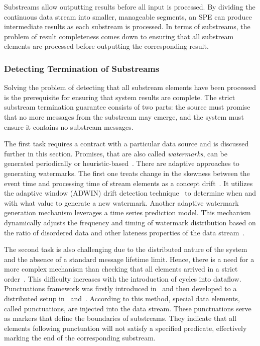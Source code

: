 Substreams allow outputting results before all input is processed. By dividing the continuous data stream into smaller, manageable segments, an SPE can produce intermediate results as each substream is processed. In terms of substreams, the problem of result completeness comes down to ensuring that all substream elements are processed before outputting the corresponding result. 

\subsubsection{Detecting Termination of Substreams}

Solving the problem of detecting that all substream elements have been processed is the prerequisite for ensuring that system results are complete. The strict substream termination guarantee consists of two parts: the source must promise that no more messages from the substream may emerge, and the system must ensure it contains no substream messages. 

The first task requires a contract with a particular data source and is discussed further in this section. Promises, that are also called {\em watermarks}, can be generated periodically or heuristic-based~\cite{Akidau:2013:MFS:2536222.2536229, akidau2015streaming}. There are adaptive approaches to generating watermarks. The first one treats change in the skewness between the event time and processing time of stream elements as a concept drift~\cite{awad2019adaptive}. It utilizes the adaptive window (ADWIN) drift detection technique~\cite{bifet2007learning, grulich2018scalable} to determine when and with what value to generate a new watermark. Another adaptive watermark generation mechanism leverages a time series prediction model. This mechanism dynamically adjusts the frequency and timing of watermark distribution based on the ratio of disordered data and other lateness properties of the data stream~\cite{song2021adaptive}.

The second task is also challenging due to the distributed nature of the system and the absence of a standard message lifetime limit. Hence, there is a need for a more complex mechanism than checking that all elements arrived in a strict order~\cite{Li:2008:OPN:1453856.1453890}. This difficulty increases with the introduction of cycles into dataflow. Punctuations framework was firstly introduced in~\cite{Tucker:2003:EPS:776752.776780} and then developed to a distributed setup in~\cite{Akidau:2015:DMP:2824032.2824076} and~\cite{Carbone:2017:SMA:3137765.3137777}. According to this method, special data elements, called punctuations, are injected into the data stream. These punctuations serve as markers that define the boundaries of substreams. They indicate that all elements following punctuation will not satisfy a specified predicate, effectively marking the end of the corresponding substream. 

